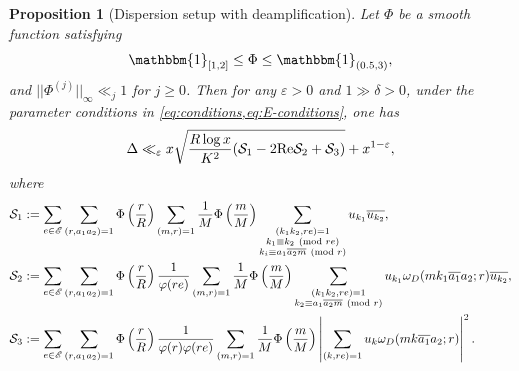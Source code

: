 \documentclass[reqno,11pt]{amsart}
\newtheorem{proposition}[theorem]{Proposition}
\theoremstyle{definition}
\theoremstyle{remark}
\numberwithin{equation}{section}
\newcommand{\msE}{\mathscr{E}}
\newcommand{\mS}{\mathcal{S}}
\newcommand{\one}{\mathbbm{1}}
\renewcommand{\Re}{\textnormal{Re}}
\newcommand{\eps}{\varepsilon}
\renewcommand{\bar}{\overline}
\renewcommand{\pmod}[1]{\ (\textnormal{mod } #1)}
\begin{document}
\begin{proposition}[Dispersion setup with deamplification] \label{prop:setup}
Let $\Phi$ be a smooth function satisfying
\begin{equation} \label{eq:phi-smooth}
    \one_{[1, 2]} \le \Phi \le \one_{(0.5, 3)},
\end{equation}
and $||\Phi^{(j)}||_\infty \ll_j 1$ for $j \ge 0$. Then for any $\eps > 0$ and $1 \gg \delta > 0$, under the parameter conditions in \cref{eq:conditions,eq:E-conditions}, one has
\begin{equation} \label{eq:setup}
    \Delta \ll_\eps x\sqrt{\frac{R \log x}{K^2} (\mS_1 - 2\Re \mS_2 + \mS_3)}
    + x^{1-\eps},
\end{equation}
where
\begin{equation} \label{eq:sums}
\begin{aligned}
    \mS_1 &:= \sum_{e \in \msE} \sum_{(r,a_1a_2)=1} \Phi\left(\frac{r}{R}\right) \sum_{(m,r)=1} \frac{1}{M} \Phi\left(\frac{m}{M}\right) \sum_{\substack{(k_1k_2,re)=1 \\ k_1 \equiv k_2 \pmod{re} \\ k_i \equiv a_1\bar{a_2m} \pmod{r}}} u_{k_1} \bar{u_{k_2}},
    \\
    \mS_2 &:= \sum_{e \in \msE} \sum_{(r,a_1a_2)=1} \Phi\left(\frac{r}{R}\right) \frac{1}{\varphi(re)}  \sum_{\substack{(m,r)=1}} \frac{1}{M} \Phi\left(\frac{m}{M}\right)  \sum_{\substack{(k_1k_2,re)=1 \\ k_2 \equiv a_1\bar{a_2m} \pmod{r}}} u_{k_1} \omega_D(mk_1 \bar{a_1}a_2; r)\bar{u_{k_2}},
    \\
    \mS_3 &:= \sum_{e \in \msE} \sum_{ (r,a_1a_2)=1} \Phi\left(\frac{r}{R}\right) \frac{1}{\varphi(r)\varphi(re)} \sum_{(m,r)=1} \frac{1}{M} \Phi\left(\frac{m}{M}\right) \left\vert \sum_{(k,re)=1} u_k \omega_D(mk \bar{a_1}a_2; r)\right\vert^2.
\end{aligned}
\end{equation}
\end{proposition}
\end{document}
